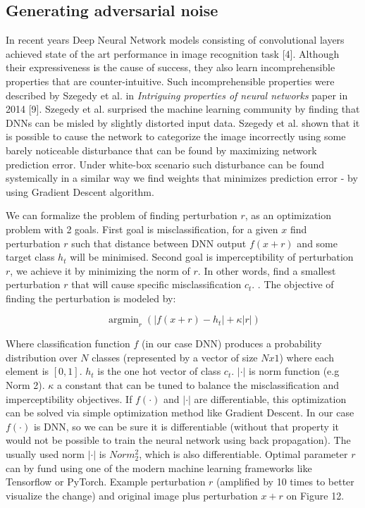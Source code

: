 \subsection{Generating adversarial noise}

In recent years Deep Neural Network models consisting of convolutional layers achieved state of the art performance in image recognition task [4]. Although their expressiveness is the cause of success, they also learn incomprehensible properties that are  counter-intuitive. Such incomprehensible properties were described by Szegedy et al. in \textit{Intriguing properties of neural networks} paper in 2014 [9]. Szegedy et al. surprised the machine learning community by finding that DNNs can be misled by slightly distorted input data. Szegedy et al. shown that it is possible to cause the network to categorize the image incorrectly using some barely noticeable disturbance that can be found by maximizing network prediction error. Under white-box scenario such disturbance can be found systemically in a similar way we find weights that minimizes prediction error - by using Gradient Descent algorithm. 

We can formalize the problem of finding perturbation $r$, as an optimization problem with 2 goals. First goal is misclassification, for a given $x$ find perturbation $r$ such that distance between DNN output $f(x+r)$ and some target class $h_t$ will be minimised. Second goal is imperceptibility of perturbation $r$, we achieve it by minimizing the norm of $r$. In other words, find a smallest perturbation $r$ that will cause specific misclassification $c_t$. . The objective of finding the perturbation is modeled by: 

\begin{equation}
\operatorname{argmin}_{r}\left(\left|f(x+r)-h_{t}\right|+\kappa|r|\right)
\end{equation}


Where classification function $f$ (in our case DNN) produces a probability distribution over $N$ classes (represented by a vector of size $Nx1$) where each element is $[0,1]$. $h_t$ is the one hot vector  of class $c_t$. $|\cdot|$ is norm function (e.g Norm 2). $\kappa$ a constant that can be tuned to balance the misclassification and imperceptibility objectives. If $f(\cdot)$ and $|\cdot|$ are differentiable, this optimization can be solved via simple optimization method like Gradient Descent. In our case $f(\cdot)$ is DNN, so we can be sure it is differentiable (without that property it would not be possible to train the neural network using back propagation). The usually used norm $|\cdot|$ is $Norm_2^2$, which is also differentiable. Optimal parameter $r$ can by fund using one of the modern machine learning frameworks like  Tensorflow or PyTorch. Example perturbation $r$ (amplified by 10 times to better visualize the change) and original image plus perturbation $x+r$ on Figure 12.  


